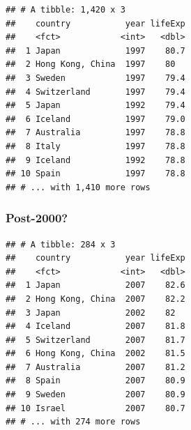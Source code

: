 \documentclass[]{article}
\newenvironment{Shaded}{\begin{snugshade}}{\end{snugshade}}
\newcommand{\KeywordTok}[1]{\textcolor[rgb]{0.13,0.29,0.53}{\textbf{#1}}}
\newcommand{\DecValTok}[1]{\textcolor[rgb]{0.00,0.00,0.81}{#1}}
\newcommand{\StringTok}[1]{\textcolor[rgb]{0.31,0.60,0.02}{#1}}
\newcommand{\OperatorTok}[1]{\textcolor[rgb]{0.81,0.36,0.00}{\textbf{#1}}}
\newcommand{\NormalTok}[1]{#1}
\begin{document}
\begin{Shaded}
\end{Shaded}

\begin{verbatim}
## # A tibble: 1,420 x 3
##    country           year lifeExp
##    <fct>            <int>   <dbl>
##  1 Japan             1997    80.7
##  2 Hong Kong, China  1997    80  
##  3 Sweden            1997    79.4
##  4 Switzerland       1997    79.4
##  5 Japan             1992    79.4
##  6 Iceland           1997    79.0
##  7 Australia         1997    78.8
##  8 Italy             1997    78.8
##  9 Iceland           1992    78.8
## 10 Spain             1997    78.8
## # ... with 1,410 more rows
\end{verbatim}

\subsubsection{Post-2000?}\label{post-2000}

\begin{Shaded}
\end{Shaded}

\begin{verbatim}
## # A tibble: 284 x 3
##    country           year lifeExp
##    <fct>            <int>   <dbl>
##  1 Japan             2007    82.6
##  2 Hong Kong, China  2007    82.2
##  3 Japan             2002    82  
##  4 Iceland           2007    81.8
##  5 Switzerland       2007    81.7
##  6 Hong Kong, China  2002    81.5
##  7 Australia         2007    81.2
##  8 Spain             2007    80.9
##  9 Sweden            2007    80.9
## 10 Israel            2007    80.7
## # ... with 274 more rows
\end{verbatim}
\end{document}
